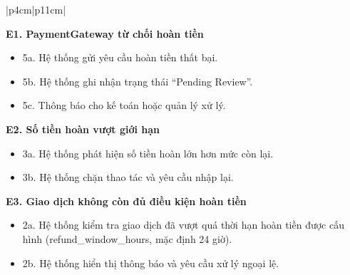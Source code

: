 \begin{longtable}{|p{4cm}|p{11cm}|}
\begin{minipage}[t]{\linewidth}
\textbf{E1. \textsf{PaymentGateway} từ chối hoàn tiền}
\begin{itemize}
\item 5a. Hệ thống gửi yêu cầu hoàn tiền thất bại.
\item 5b. Hệ thống ghi nhận trạng thái “Pending Review”.
\item 5c. Thông báo cho kế toán hoặc quản lý xử lý.
\end{itemize}

\vspace{0.3mm}

\textbf{E2. Số tiền hoàn vượt giới hạn}
\begin{itemize}
\item 3a. Hệ thống phát hiện số tiền hoàn lớn hơn mức còn lại.
\item 3b. Hệ thống chặn thao tác và yêu cầu nhập lại.
\end{itemize}

\vspace{0.3mm}

\textbf{E3. Giao dịch không còn đủ điều kiện hoàn tiền}
\begin{itemize}
\item 2a. Hệ thống kiểm tra giao dịch đã vượt quá thời hạn hoàn tiền được cấu hình (refund\_window\_hours, mặc định 24 giờ).
\item 2b. Hệ thống hiển thị thông báo và yêu cầu xử lý ngoại lệ.
\end{itemize}

\vspace{0.3mm}
\end{minipage}
\\ \hline

\end{longtable}

\renewcommand{\arraystretch}{1.2}

